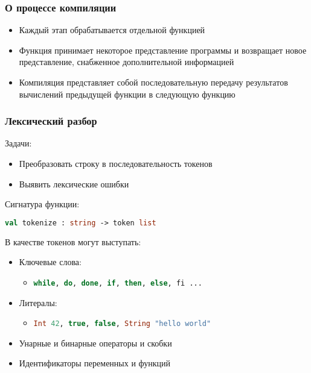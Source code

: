 \documentclass{beamer}
\begin{document}
	\begin{frame}
		\frametitle{О процессе компиляции}
			\begin{itemize}
			\item Каждый этап обрабатывается отдельной функцией
			\item Функция принимает некоторое представление программы и возвращает новое представление, снабженное дополнительной информацией
			\item Компиляция представляет собой последовательную передачу результатов вычислений предыдущей функции в следующую функцию
			\end{itemize}
	\end{frame}

	\begin{frame}[fragile]
		\frametitle{Лексический разбор}
			Задачи:
			\begin{itemize}
				\item Преобразовать строку в последовательность токенов
				\item Выявить лексические ошибки
			\end{itemize}
			Сигнатура функции:

			\begin{lstlisting}[language=ML] 
			val tokenize : string -> token list
			\end{lstlisting}

			В качестве токенов могут выступать:
			\begin{itemize}
				\item Ключевые слова:
				\begin{itemize}
					\item \lstinline[language=ML]|while, do, done, if, then, else, fi ...|
				\end{itemize}
				\item Литералы:
				\begin{itemize}
					\item \lstinline[language=ML]|Int 42, true, false, String "hello world"|
				\end{itemize}
				\item Унарные и бинарные операторы и скобки
				\item Идентификаторы переменных и функций
			\end{itemize}
	\end{frame}
	
\end{document}
